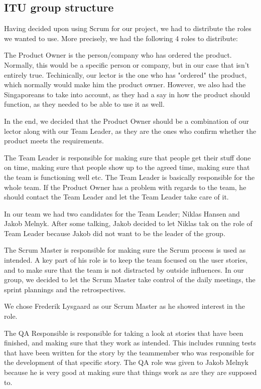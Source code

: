 \subsection{ITU group structure}
\label{Collaboration_Development_ITU}
Having decided upon using Scrum for our project, we had to distribute the roles we wanted to use. More precisely, we had the following 4 roles to distribute: 
\begin{my_description}
\item[Product Owner]
The Product Owner is the person/company who has ordered the product. Normally, this would be a specific person or company, but in our case that isn't entirely true. Techinically, our lector is the one who has "ordered" the product, which normally would make him the product owner. However, we also had the Singaporeans to take into account, as they had a say in how the product should function, as they needed to be able to use it as well.

In the end, we decided that the Product Owner should be a combination of our lector along with our Team Leader, as they are the ones who confirm whether the product meets the requirements.

\item[Team Leader]
The Team Leader is responsible for making sure that people get their stuff done on time, making sure that people show up to the agreed time, making sure that the team is functioning well etc. The Team Leader is basically responsible for the whole team. If the Product Owner has a problem with regards to the team, he should contact the Team Leader and let the Team Leader take care of it.

In our team we had two candidates for the Team Leader; Niklas Hansen and Jakob Melnyk. After some talking, Jakob decided to let Niklas tak on the role of Team Leader because Jakob did not want to be the leader of the group.

\item[Scrum Master]
The Scrum Master is responsible for making sure the Scrum process is used as intended. A key part of his role is to keep the team focused on the user stories, and to make sure that the team is not distracted by outside influences. In our group, we decided to let the Scrum Master take control of the daily meetings, the sprint plannings and the retrospectives.

We chose Frederik Lysgaard as our Scrum Master as he showed interest in the role.

\item[QA Responsible]
The QA Responsible is responsible for taking a look at stories that have been finished, and making sure that they work as intended. This includes running tests that have been written for the story by the teammember who was responsible for the development of that specific story.
The QA role was given to Jakob Melnyk because he is very good at making sure that things work as are they are supposed to.
\end{my_description}

